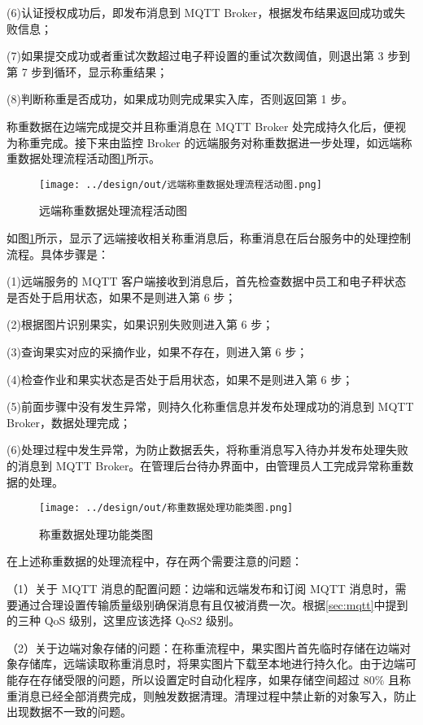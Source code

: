(6)认证授权成功后，即发布消息到 MQTT Broker，根据发布结果返回成功或失败信息；

(7)如果提交成功或者重试次数超过电子秤设置的重试次数阈值，则退出第 3 步到第 7 步到循环，显示称重结果；

(8)判断称重是否成功，如果成功则完成果实入库，否则返回第 1 步。

称重数据在边端完成提交并且称重消息在 MQTT Broker 处完成持久化后，便视为称重完成。接下来由监控 Broker 的远端服务对称重数据进一步处理，如远端称重数据处理流程活动图\ref{fig:远端称重数据处理流程活动图}所示。

\begin{figure}
    \centering
    \texttt{[image: ../design/out/远端称重数据处理流程活动图.png]}
    \caption{远端称重数据处理流程活动图}
    \label{fig:远端称重数据处理流程活动图}
\end{figure}

如图\ref{fig:远端称重数据处理流程活动图}所示，显示了远端接收相关称重消息后，称重消息在后台服务中的处理控制流程。具体步骤是：

(1)远端服务的 MQTT 客户端接收到消息后，首先检查数据中员工和电子秤状态是否处于启用状态，如果不是则进入第 6 步；

(2)根据图片识别果实，如果识别失败则进入第 6 步；

(3)查询果实对应的采摘作业，如果不存在，则进入第 6 步；

(4)检查作业和果实状态是否处于启用状态，如果不是则进入第 6 步；

(5)前面步骤中没有发生异常，则持久化称重信息并发布处理成功的消息到 MQTT Broker，数据处理完成；

(6)处理过程中发生异常，为防止数据丢失，将称重消息写入待办并发布处理失败的消息到 MQTT Broker。在管理后台待办界面中，由管理员人工完成异常称重数据的处理。

\begin{figure}
    \centering
    \texttt{[image: ../design/out/称重数据处理功能类图.png]}
    \caption{称重数据处理功能类图}
    \label{fig:称重数据处理功能类图}
\end{figure}

在上述称重数据的处理流程中，存在两个需要注意的问题：

（1）关于 MQTT 消息的配置问题：边端和远端发布和订阅 MQTT 消息时，需要通过合理设置传输质量级别确保消息有且仅被消费一次。根据\ref{sec:mqtt}中提到的三种 QoS 级别，这里应该选择 QoS2 级别。

（2）关于边端对象存储的问题：在称重流程中，果实图片首先临时存储在边端对象存储库，远端读取称重消息时，将果实图片下载至本地进行持久化。由于边端可能存在存储受限的问题，所以设置定时自动化程序，如果存储空间超过 80\% 且称重消息已经全部消费完成，则触发数据清理。清理过程中禁止新的对象写入，防止出现数据不一致的问题。

